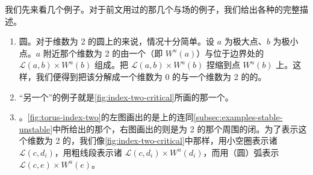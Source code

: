 我们先来看几个例子。对于前文用过的那几个\trMorseFunction{}与\trPseudogradient{}场的例子，我们给出各种\trCellular{}的完整描述。

\begin{example}\label{thm:cell-examples-sphere-torus}
\begin{enumerate}[label=(\arabic*)]
\item 圆\trSphere。对于维数为 2 的圆\trSphere{}上的\trHeightFunction{}来说，情况十分简单。设 $a$ 为极大点、$b$ 为极小点。$a$ 附近那个维数为 2 的\trCellular{}由一个\trOpen{}\trDisk{}（即\trUnstableManifold{} $W^u(a)$）与位于边界处的\trCircle{} $\mathcal{L}(a,b)\times W^u(b)$ 组成。\trAttachingMap{}把 $\mathcal{L}(a,b)\times W^u(b)$ 捏缩到点 $W^u(b)$ 上。这样，我们便得到把该\trSphere{}分解成一个维数为 0 的\trCellular{}与一个维数为 2 的\trCellular{}的\trCellularDecomposition。
\item “另一个”\trSphere{}的例子就是\cref{fig:index-two-critical}所画的那一个。
\item \trTorus。\cref{fig:torus-index-two}的左图画出的是\trTorus{}上的\trMorseFunction{}连同\cref{subsec:examples-stable-unstable}中所给出的那个\trPseudogradient，右图画出的则是\trIndex{}为 2 的那个\trCriticalPoint{}周围的闭\trCellular。为了表示这个维数为 2 的\trCellular，我们像\cref{fig:index-two-critical}中那样，用小空圈表示诸 $\mathcal{L}(c,d_i)$，用粗线段表示诸 $\mathcal{L}(c,d_i)\times W^u(d_i)$，而用（圆）弧表示 $\mathcal{L}(c,e)\times W^u(e)$。
\end{enumerate}
\end{example}

